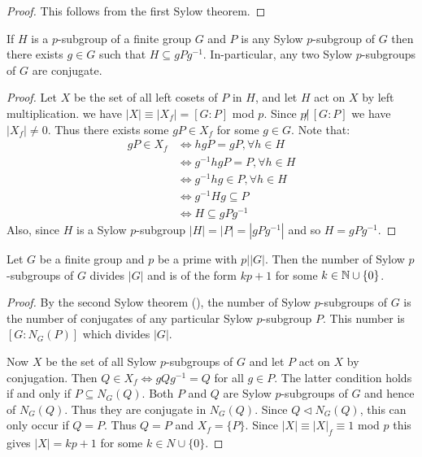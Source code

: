 \documentclass[11pt]{article}
\begin{document}
\begin{proof}
    This follows from the first Sylow theorem.
\end{proof}

\begin{theorem}
    If $H$ is a $p$-subgroup of a finite group $G$ and $P$ is any Sylow $p$-subgroup of $G$ then there exists $g\in G$ such that $H\subseteq gPg^{-1}$. In-particular, any two Sylow $p$-subgroups of $G$ are conjugate.
\end{theorem}

\begin{proof}
    Let $X$ be the set of all left cosets of $P$ in $H$, and let $H$ act on $X$ by left multiplication.  we have $|X|\equiv|X_f|=[G:P]$ mod $p$. Since $p\not|\,[G:P]$ we have $|X_f|\neq 0$. Thus there exists some $gP\in X_f$ for some $g\in G$. Note that:
    \begin{align*}
        gP\in X_f&\iff hgP=gP,\forall h\in H \\
        &\iff g^{-1}hgP=P,\forall h\in H \\
        &\iff g^{-1}hg\in P,\forall h\in H \\
        &\iff g^{-1}Hg\subseteq P \\
        &\iff H\subseteq gPg^{-1}
    \end{align*}
    Also, since $H$ is a Sylow $p$-subgroup $|H|=|P|=|gPg^{-1}|$ and so $H=gPg^{-1}$.
\end{proof}

\begin{theorem}
    Let $G$ be a finite group and $p$ be a prime with $p\big||G|$. Then the number of Sylow $p$-subgroups of $G$ divides $|G|$ and is of the form $kp+1$ for some $k\in\mathbb{N}\cup\{0\}$.
\end{theorem}

\begin{proof}
    By the second Sylow theorem (), the number of Sylow $p$-subgroups of $G$ is the number of conjugates of any particular Sylow $p$-subgroup $P$. This number is $[G:N_G(P)]$ which divides $|G|$.

    Now $X$ be the set of all Sylow $p$-subgroups of $G$ and let $P$ act on $X$ by conjugation. Then $Q\in X_f\iff gQg^{-1}=Q$ for all $g\in P$. The latter condition holds if and only if $P\subseteq N_G(Q)$. Both $P$ and $Q$ are Sylow $p$-subgroups of $G$ and hence of $N_G(Q)$. Thus they are conjugate in $N_G(Q)$. Since $Q\lhd N_G(Q)$, this can only occur if $Q=P$. Thus $Q=P$ and $X_f=\{P\}$. Since $|X|\equiv|X|_f\equiv1$ mod $p$ this gives $|X|=kp+1$ for some $k\in N\cup\{0\}$.
\end{proof}
\end{document}
